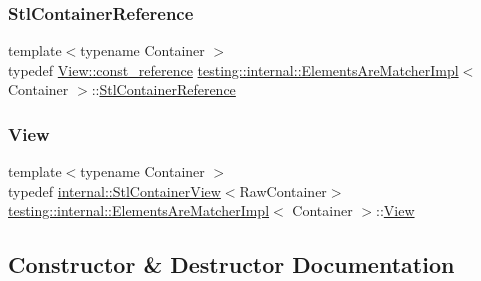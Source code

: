 \subsubsection{\texorpdfstring{Stl\+Container\+Reference}{StlContainerReference}}
{\footnotesize\ttfamily template$<$typename Container $>$ \\
typedef \hyperlink{classtesting_1_1internal_1_1_stl_container_view_a9cd4f6ed689b3938cdb7b3c4cbf1b36b}{View\+::const\+\_\+reference} \hyperlink{classtesting_1_1internal_1_1_elements_are_matcher_impl}{testing\+::internal\+::\+Elements\+Are\+Matcher\+Impl}$<$ Container $>$\+::\hyperlink{classtesting_1_1internal_1_1_elements_are_matcher_impl_ad5d20c1aa6e8c06c82fe3ac4d68c2278}{Stl\+Container\+Reference}}

\mbox{\label{classtesting_1_1internal_1_1_elements_are_matcher_impl_a68c37c6cc56c047323543044445a5022}} 
\subsubsection{\texorpdfstring{View}{View}}
{\footnotesize\ttfamily template$<$typename Container $>$ \\
typedef \hyperlink{classtesting_1_1internal_1_1_stl_container_view}{internal\+::\+Stl\+Container\+View}$<$Raw\+Container$>$ \hyperlink{classtesting_1_1internal_1_1_elements_are_matcher_impl}{testing\+::internal\+::\+Elements\+Are\+Matcher\+Impl}$<$ Container $>$\+::\hyperlink{classtesting_1_1internal_1_1_elements_are_matcher_impl_a68c37c6cc56c047323543044445a5022}{View}}



\subsection{Constructor \& Destructor Documentation}
\mbox{\label{classtesting_1_1internal_1_1_elements_are_matcher_impl_abfe21bd90e0c085d4a171e22f1e2cc09}} 
